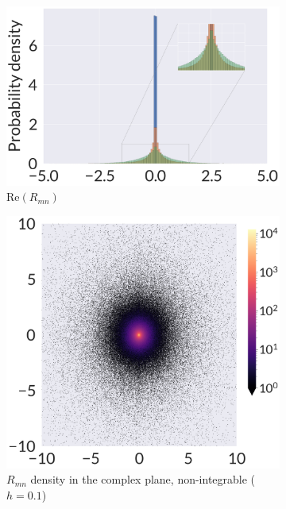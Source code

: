 \begin{figure}
	\centering
\begin{subfigure}[b]{0.5\textwidth}
	\centering
\includegraphics[width=\columnwidth]{figures/chapter1/gamma-dist-hist.png}
\caption{$\text{Re}(R_{mn})$}
\end{subfigure}%
\begin{subfigure}[b]{0.25\textwidth}
	\centering
\includegraphics[width=\columnwidth]{figures/chapter1/gamma01-2ddist-hist.png}
\caption{$R_{mn}$ density in the complex plane, non-integrable ($h=0.1$)}
\end{subfigure}%
\begin{subfigure}[b]{0.25\textwidth}

\end{subfigure}
\end{figure}
